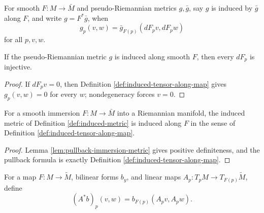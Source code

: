 \begin{definition}
\label{def:induced-tensor-along-map}
\leanok
{}
For smooth $F:M\to\bar M$ and pseudo-Riemannian metrics $g,\bar g$, say $g$ is induced by $\bar g$ along $F$, and write $g=F^*\bar g$, when
\[
g_p(v,w)=\bar g_{F(p)}(dF_pv,dF_pw)
\]
for all $p,v,w$.
\end{definition}

\begin{lemma}
\label{lem:pseudo-submanifold-immersion}
\leanok
{}
If the pseudo-Riemannian metric $g$ is induced along smooth $F$, then every $dF_p$ is injective.
\end{lemma}
\begin{proof}
\leanok
{}
\sketch If $dF_pv=0$, then Definition \ref{def:induced-tensor-along-map} gives $g_p(v,w)=0$ for every $w$; nondegeneracy forces $v=0$.
\end{proof}

\begin{lemma}
\label{lem:riemannian-submanifold-induced-tensor}
\leanok
{}
For a smooth immersion $F:M\to\bar M$ into a Riemannian manifold, the induced metric of Definition \ref{def:induced-metric} is induced along $F$ in the sense of Definition \ref{def:induced-tensor-along-map}.
\end{lemma}
\begin{proof}
\leanok
{}
\sketch Lemma \ref{lem:pullback-immersion-metric} gives positive definiteness, and the pullback formula is exactly Definition \ref{def:induced-tensor-along-map}.
\end{proof}

\begin{definition}
\label{def:bilinear-comp-of-family}
\leanok
For a map $F:M\to\widetilde M$, bilinear forms $b_y$, and linear maps $A_p:T_pM\to T_{F(p)}\widetilde M$, define
\[
(A^*b)_p(v,w)=b_{F(p)}(A_pv,A_pw).
\]
\end{definition}

